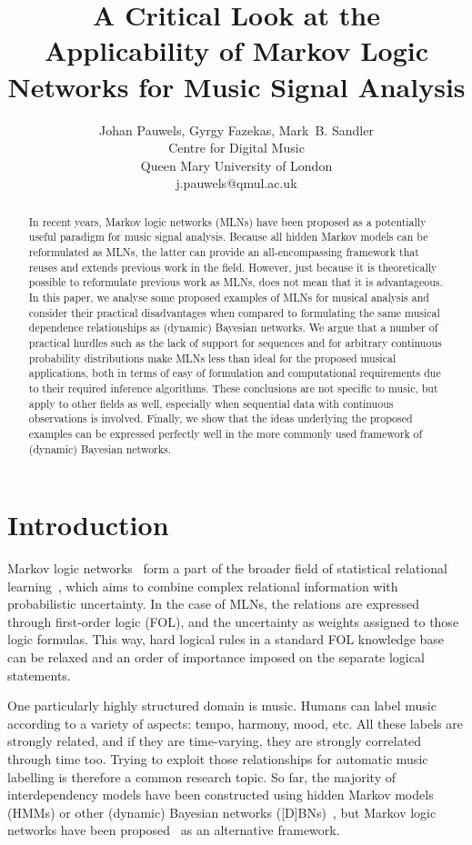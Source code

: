 \documentclass[letterpaper]{article} %
\title{A Critical Look at the Applicability of Markov Logic Networks for Music Signal Analysis}
\author{Johan Pauwels, Gyrgy Fazekas, Mark~B. Sandler\\ %
Centre for Digital Music\\
Queen Mary University of London\\
j.pauwels@qmul.ac.uk %
}
\begin{document}
\maketitle

\begin{abstract}
In recent years, Markov logic networks (MLNs) have been proposed as a potentially useful paradigm for music signal analysis. Because all hidden Markov models can be reformulated as MLNs, the latter can provide an all-encompassing framework that reuses and extends previous work in the field. However, just because it is theoretically possible to reformulate previous work as MLNs, does not mean that it is advantageous. In this paper, we analyse some proposed examples of MLNs for musical analysis and consider their practical disadvantages when compared to formulating the same musical dependence relationships as (dynamic) Bayesian networks. We argue that a number of practical hurdles such as the lack of support for sequences and for arbitrary continuous probability distributions make MLNs less than ideal for the proposed musical applications, both in terms of easy of formulation and computational requirements due to their required inference algorithms. These conclusions are not specific to music, but apply to other fields as well, especially when sequential data with continuous observations is involved.
Finally, we show that the ideas underlying the proposed examples can be expressed perfectly well in the more commonly used framework of (dynamic) Bayesian networks.
\end{abstract}

\section{Introduction}
Markov logic networks~\cite{richardson2006ml} form a part of the broader field of statistical relational learning~\cite{getoor2007itsrl}, which aims to combine complex relational information with probabilistic uncertainty. In the case of MLNs, the relations are expressed through first-order logic (FOL), and the uncertainty as weights assigned to those logic formulas. This way, hard logical rules in a standard FOL knowledge base can be relaxed and an order of importance imposed on the separate logical statements.

One particularly highly structured domain is music. Humans can label music according to a variety of aspects: tempo, harmony, mood, etc. All these labels are strongly related, and if they are time-varying, they are strongly correlated through time too. Trying to exploit those relationships for automatic music labelling is therefore a common research topic. So far, the majority of interdependency models have been constructed using hidden Markov models (HMMs) or other (dynamic) Bayesian networks ([D]BNs)~\cite{mauch2010taslp,pauwels2013ismir,pauwels2014jnmr}, but Markov logic networks have been proposed~\cite{papadopoulos2012ismir,papadopoulos2013icassp,papadopoulos2017taslp} as an alternative framework.
\end{document}
